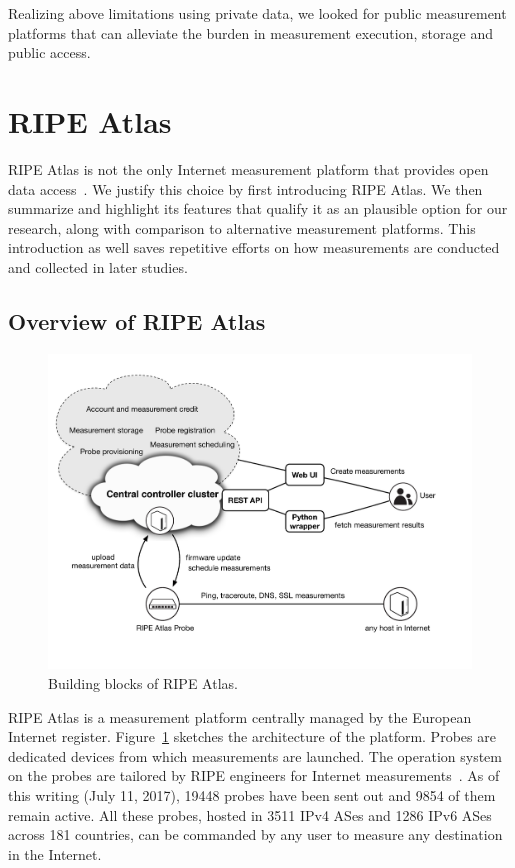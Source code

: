 Realizing above limitations using private data, we looked for public measurement platforms that  can alleviate the burden in measurement execution, storage and public access.

\section{RIPE Atlas}
RIPE Atlas is not the only Internet measurement platform that provides open data access~\cite{Bajpai2015}.
We justify this choice by first introducing RIPE Atlas. 
We then summarize and highlight its features that qualify it as an plausible option for our research,  along with comparison to alternative measurement platforms.
This introduction as well saves repetitive efforts on how measurements are conducted and collected in later studies.

\subsection{Overview of RIPE Atlas}
\begin{figure}[!htb]
\centering
\includegraphics[width=\textwidth]{gfx/chap3/ripe_atlas_archi.pdf}
\caption{Building blocks of RIPE Atlas.}
\label{fig:ripe_atlas_archi}
\end{figure}

\acf{RIPE} Atlas is a measurement platform centrally managed by the European Internet register.
Figure~\ref{fig:ripe_atlas_archi} sketches the architecture of the platform.
Probes are dedicated devices from which measurements are launched.
The operation system on the probes are tailored by RIPE engineers for Internet measurements~\cite{firmware}.
As of this writing (July 11, 2017), 19448 probes have been sent out and 9854 of them remain active.
All these probes, hosted in 3511 IPv4 ASes and 1286 IPv6 ASes across 181 countries, can be commanded by any user to measure any destination in the Internet.

